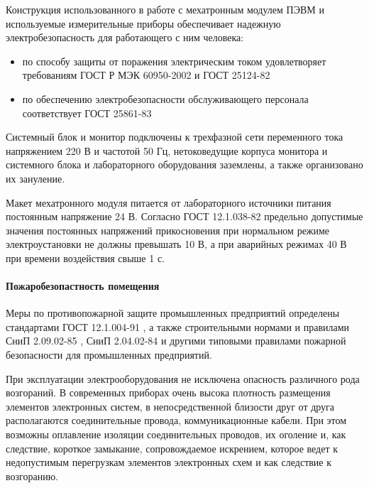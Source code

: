 Конструкция использованного в работе с мехатронным модулем ПЭВМ и используемые
измерительные приборы обеспечивает надежную электробезопасность для работающего
с ним человека:

\begin{itemize}
    \item   по способу защиты от поражения электрическим током удовлетворяет
            требованиям ГОСТ Р МЭК 60950-2002 \cite{ecology_gost_60950_2002}
            и ГОСТ 25124-82 \cite{ecology_gost_25124_82}

    \item   по обеспечению электробезопасности обслуживающего персонала
            соответствует ГОСТ 25861-83 \cite{ecology_gost_25861_83}
\end{itemize}

Системный блок и монитор подключены к трехфазной сети переменного тока напряжением
220 В и частотой 50 Гц, нетоковедущие корпуса монитора и системного блока и лабораторного
оборудования заземлены, а также организовано их зануление.

Макет мехатронного модуля питается от лабораторного источники питания постоянным
напряжение 24 В. Согласно ГОСТ 12.1.038-82 \cite{ecology_gost_038_82}
предельно допустимые значения постоянных напряжений прикосновения при нормальном
режиме электроустановки не должны превышать 10 В, а при аварийных режимах 40 В
при времени воздействия свыше 1 с.

\paragraph{Пожаробезопастность помещения}

Меры по противопожарной защите промышленных предприятий определены стандартами
ГОСТ 12.1.004-91 \cite{ecology_gost_004_91}, а также строительными нормами
и правилами СниП 2.09.02-85 \cite{ecology_snip_02_85}, СниП 2.04.02-84
\cite{ecology_snip_02_84} и другими типовыми правилами пожарной безопасности для
промышленных предприятий.

При эксплуатации электрооборудования не исключена опасность различного рода возгораний.
В современных приборах очень высока плотность размещения элементов электронных
систем, в непосредственной близости друг от друга располагаются соединительные
провода, коммуникационные кабели. При этом возможны оплавление изоляции соединительных
проводов, их оголение и, как следствие, короткое замыкание, сопровождаемое искрением,
которое ведет к недопустимым перегрузкам элементов электронных схем и как следствие
к возгоранию.

